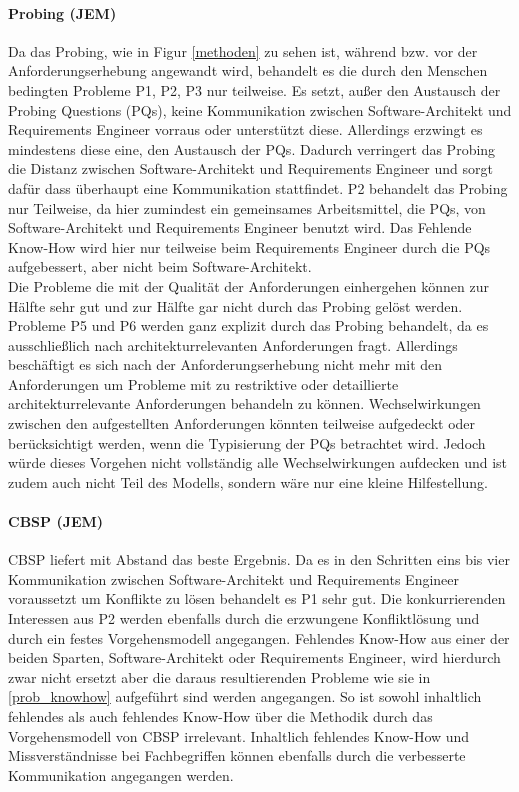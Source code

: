 \paragraph{Probing (JEM)}
Da das Probing, wie in Figur \ref{methoden} zu sehen ist, w\"ahrend bzw. vor der Anforderungserhebung angewandt wird, behandelt es die durch den Menschen bedingten Probleme P1, P2, P3 nur teilweise. Es setzt, au\ss{}er den Austausch der Probing Questions (PQs), keine Kommunikation zwischen Software-Architekt und Requirements Engineer vorraus oder unterst\"utzt diese. Allerdings erzwingt es mindestens diese eine, den Austausch der PQs. Dadurch verringert das Probing die Distanz zwischen Software-Architekt und Requirements Engineer und  sorgt daf\"ur dass \"uberhaupt eine Kommunikation stattfindet. P2 behandelt das Probing nur Teilweise, da hier zumindest ein gemeinsames Arbeitsmittel, die PQs, von Software-Architekt und Requirements Engineer benutzt wird. Das Fehlende Know-How wird hier nur teilweise beim Requirements Engineer durch die PQs aufgebessert, aber nicht beim Software-Architekt. \\

Die Probleme die mit der Qualit\"at der Anforderungen einhergehen k\"onnen zur H\"alfte sehr gut und zur H\"alfte gar nicht durch das Probing gel\"ost werden. Probleme P5 und P6 werden ganz explizit durch das Probing behandelt, da es ausschlie\ss{}lich nach architekturrelevanten Anforderungen fragt. Allerdings besch\"aftigt es sich nach der Anforderungserhebung nicht mehr mit den Anforderungen um Probleme mit zu restriktive oder detaillierte architekturrelevante Anforderungen behandeln zu k\"onnen. Wechselwirkungen zwischen den aufgestellten Anforderungen k\"onnten teilweise aufgedeckt oder ber\"ucksichtigt werden, wenn die Typisierung der PQs betrachtet wird. Jedoch w\"urde dieses Vorgehen nicht vollst\"andig alle Wechselwirkungen aufdecken und ist zudem auch nicht Teil des Modells, sondern w\"are nur eine kleine Hilfestellung. \\

\paragraph{CBSP (JEM)}
CBSP liefert mit Abstand das beste Ergebnis. Da es in den Schritten eins bis vier Kommunikation zwischen Software-Architekt und Requirements Engineer voraussetzt um Konflikte zu l\"osen behandelt es P1 sehr gut. Die konkurrierenden Interessen aus P2 werden ebenfalls durch die erzwungene Konfliktl\"osung und durch ein festes Vorgehensmodell angegangen. Fehlendes Know-How aus einer der beiden Sparten, Software-Architekt oder Requirements Engineer, wird hierdurch zwar nicht ersetzt aber die daraus resultierenden Probleme wie sie in \ref{prob_knowhow} aufgef\"uhrt sind werden angegangen. So ist sowohl inhaltlich fehlendes als auch fehlendes Know-How \"uber die Methodik durch das Vorgehensmodell von CBSP irrelevant. Inhaltlich fehlendes Know-How und Missverst\"andnisse bei Fachbegriffen k\"onnen ebenfalls durch die verbesserte Kommunikation angegangen werden. \\


